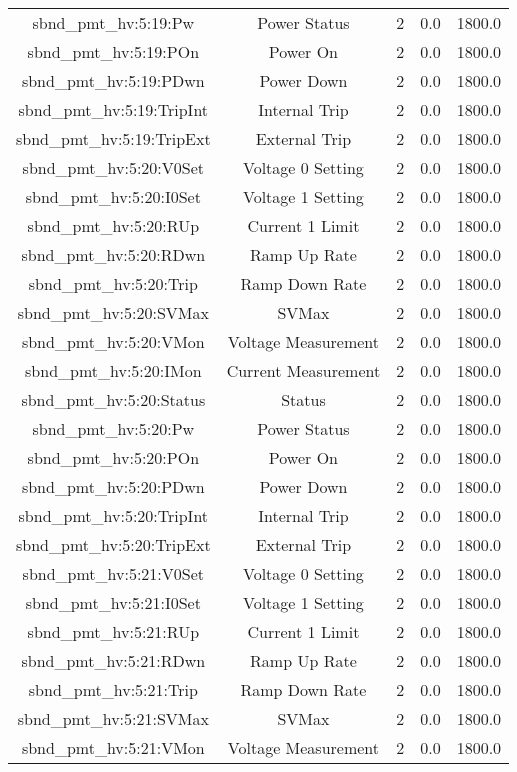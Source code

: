 \begin{center}
\begin{longtable}{c | c c c c }
sbnd\_pmt\_hv:5:19:Pw & Power Status & 2 & 0.0 & 1800.0\\ 
sbnd\_pmt\_hv:5:19:POn & Power On & 2 & 0.0 & 1800.0\\ 
sbnd\_pmt\_hv:5:19:PDwn & Power Down & 2 & 0.0 & 1800.0\\ 
sbnd\_pmt\_hv:5:19:TripInt & Internal Trip & 2 & 0.0 & 1800.0\\ 
sbnd\_pmt\_hv:5:19:TripExt & External Trip & 2 & 0.0 & 1800.0\\ 
sbnd\_pmt\_hv:5:20:V0Set & Voltage 0 Setting & 2 & 0.0 & 1800.0\\ 
sbnd\_pmt\_hv:5:20:I0Set & Voltage 1 Setting & 2 & 0.0 & 1800.0\\ 
sbnd\_pmt\_hv:5:20:RUp & Current 1 Limit & 2 & 0.0 & 1800.0\\ 
sbnd\_pmt\_hv:5:20:RDwn & Ramp Up Rate & 2 & 0.0 & 1800.0\\ 
sbnd\_pmt\_hv:5:20:Trip & Ramp Down Rate & 2 & 0.0 & 1800.0\\ 
sbnd\_pmt\_hv:5:20:SVMax & SVMax & 2 & 0.0 & 1800.0\\ 
sbnd\_pmt\_hv:5:20:VMon & Voltage Measurement & 2 & 0.0 & 1800.0\\ 
sbnd\_pmt\_hv:5:20:IMon & Current Measurement & 2 & 0.0 & 1800.0\\ 
sbnd\_pmt\_hv:5:20:Status & Status & 2 & 0.0 & 1800.0\\ 
sbnd\_pmt\_hv:5:20:Pw & Power Status & 2 & 0.0 & 1800.0\\ 
sbnd\_pmt\_hv:5:20:POn & Power On & 2 & 0.0 & 1800.0\\ 
sbnd\_pmt\_hv:5:20:PDwn & Power Down & 2 & 0.0 & 1800.0\\ 
sbnd\_pmt\_hv:5:20:TripInt & Internal Trip & 2 & 0.0 & 1800.0\\ 
sbnd\_pmt\_hv:5:20:TripExt & External Trip & 2 & 0.0 & 1800.0\\ 
sbnd\_pmt\_hv:5:21:V0Set & Voltage 0 Setting & 2 & 0.0 & 1800.0\\ 
sbnd\_pmt\_hv:5:21:I0Set & Voltage 1 Setting & 2 & 0.0 & 1800.0\\ 
sbnd\_pmt\_hv:5:21:RUp & Current 1 Limit & 2 & 0.0 & 1800.0\\ 
sbnd\_pmt\_hv:5:21:RDwn & Ramp Up Rate & 2 & 0.0 & 1800.0\\ 
sbnd\_pmt\_hv:5:21:Trip & Ramp Down Rate & 2 & 0.0 & 1800.0\\ 
sbnd\_pmt\_hv:5:21:SVMax & SVMax & 2 & 0.0 & 1800.0\\ 
sbnd\_pmt\_hv:5:21:VMon & Voltage Measurement & 2 & 0.0 & 1800.0\\ 

\end{longtable}
\end{center}
